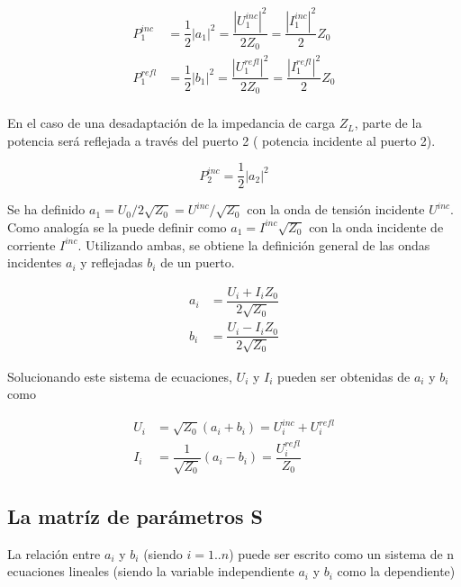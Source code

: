 \begin{equation}
\begin{aligned}
	P_1^{inc} &= \dfrac{1}{2}|a_1|^2= \dfrac{|U_1^{inc}|^2}{2Z_0}=\dfrac{|I_1^{inc}|^2}{2}Z_0 \\
	P_1^{refl} &= \dfrac{1}{2}|b_1|^2= \dfrac{|U_1^{refl}|^2}{2Z_0}=\dfrac{|I_1^{refl}|^2}{2}Z_0 \\
\end{aligned}
\end{equation}

En el caso de una desadaptación de la impedancia de carga $Z_L$, parte de la potencia será reflejada a través del puerto 2 (
potencia incidente al puerto 2).

$$
P_2^{inc}=\dfrac{1}{2}|a_2|^2
$$

Se ha definido $a_1 = U_0/2\sqrt{Z_0} = U^{inc}/\sqrt{Z_0}$ con la onda de tensión incidente $U^{inc}$. Como analogía 
se la puede definir como $a_1 = I^{inc}\sqrt{Z_0}$ con la onda incidente de corriente $I^{inc}$. Utilizando ambas, se obtiene la 
definición general de las ondas incidentes $a_i$ y reflejadas $b_i$ de un puerto.

\begin{equation}
\begin{aligned}
	a_i &= \dfrac{U_i + I_iZ_0}{2\sqrt{Z_0}} \\
	b_i &= \dfrac{U_i - I_iZ_0}{2\sqrt{Z_0}}
\end{aligned}
\label{eq:waves}
\end{equation}

Solucionando este sistema de ecuaciones, $U_i$ y $I_i$ pueden ser obtenidas de $a_i$ y $b_i$ como

\begin{equation}
\begin{aligned}
	U_i &= \sqrt{Z_0}(a_i + b_i) = U_i^{inc} + U_i^{refl}\\
	I_i &= \dfrac{1}{\sqrt{Z_0}}(a_i - b_i) = \dfrac{U_i^{refl}}{Z_0}
\end{aligned}
\end{equation}


\subsection{La matríz de parámetros S}

La relación entre $a_i$ y $b_i$ (siendo $i=1..n$) puede ser escrito como un sistema de n ecuaciones lineales (siendo la variable 
independiente $a_i$ y $b_i$ como la dependiente)

